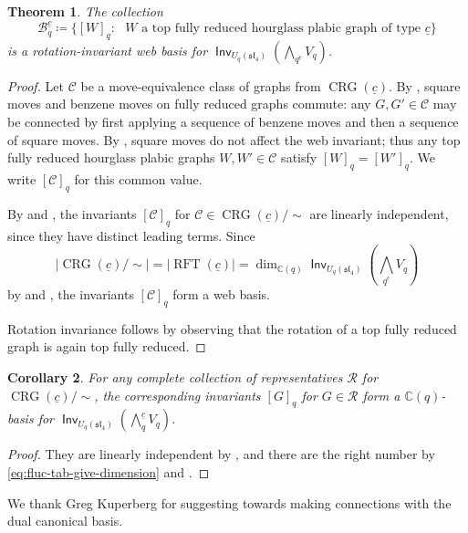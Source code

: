 \documentclass{amsart}
\newtheorem{theorem}{Theorem}[section]
\newtheorem{corollary}[theorem]{Corollary}
\theoremstyle{definition}
\theoremstyle{remark}
\numberwithin{equation}{section}
\DeclareMathOperator{\rft}{RFT}
\newcommand{\fsl}{\mathfrak{sl}}
\DeclareMathOperator{\Inv}{\mathsf{Inv}}
\DeclareMathOperator{\crg}{CRG}
\begin{document}
\begin{theorem}
\label{thm:web-basis}
The collection 
\[
\mathscr{B}_q^{\underline{c}} \coloneqq \{[W]_q : \text{ $W$ a top fully reduced hourglass plabic graph of type $\underline{c}$}\}
\]
is a rotation-invariant web basis for $\Inv_{U_q(\fsl_4)}(\bigwedge_q\nolimits^{\underline{c}} V_q)$.
\end{theorem}
\begin{proof}
Let $\mathcal{C}$ be a move-equivalence class of graphs from $\crg(\underline{c})$. By , square moves and benzene moves on fully reduced graphs commute: any $G,G' \in \mathcal{C}$ may be connected by first applying a sequence of benzene moves and then a sequence of square moves. By \cite[Eq.~2.10]{Cautis-Kamnitzer-Morrison}, square moves do not affect the web invariant; thus any top fully reduced hourglass plabic graphs $W,W' \in \mathcal{C}$ satisfy $[W]_q=[W']_q$. We write $[\mathcal{C}]_q$ for this common value.

By  and , the invariants $[\mathcal{C}]_q$ for $\mathcal{C} \in \crg(\underline{c})/{\sim}$ are linearly independent, since they have distinct leading terms. Since 
\[
|\crg(\underline{c})/{\sim}| =|\rft(\underline{c})|=\dim_{\mathbb{C}(q)} \Inv_{U_q(\fsl_4)}(\bigwedge_q\nolimits^{\underline{c}} V_q)
\]
by  and ,  the invariants $[\mathcal{C}]_q$ form a web basis.

Rotation invariance follows by observing that the rotation of a top fully reduced graph is again top fully reduced.
\end{proof}

\begin{corollary}
  For any complete collection of representatives $\mathscr{R}$ for $\crg(\underline{c})/{\sim}$, the corresponding invariants $[G]_q$ for $G \in \mathscr{R}$ form a $\mathbb{C}(q)$-basis for $\Inv_{U_q(\fsl_4)}(\bigwedge\nolimits_q^{\underline{c}} V_q)$.
\end{corollary}

\begin{proof}
  They are linearly independent by , and there are the right number by \eqref{eq:fluc-tab-give-dimension} and .
\end{proof}

We thank Greg Kuperberg for suggesting  towards making connections with the dual canonical basis.
\end{document}
